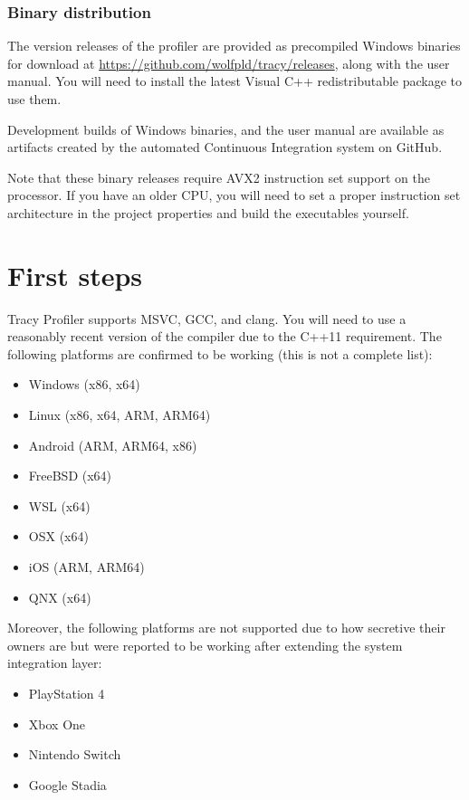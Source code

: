 \documentclass[hidelinks,titlepage,a4paper]{article}
\begin{document}
\subsubsection{Binary distribution}

The version releases of the profiler are provided as precompiled Windows binaries for download at \url{https://github.com/wolfpld/tracy/releases}, along with the user manual. You will need to install the latest Visual C++ redistributable package to use them.

Development builds of Windows binaries, and the user manual are available as artifacts created by the automated Continuous Integration system on GitHub.

Note that these binary releases require AVX2 instruction set support on the processor. If you have an older CPU, you will need to set a proper instruction set architecture in the project properties and build the executables yourself.

\section{First steps}
\label{firststeps}

Tracy Profiler supports  MSVC, GCC, and clang. You will need to use a reasonably recent version of the compiler due to the C++11 requirement. The following platforms are confirmed to be working (this is not a complete list):

\begin{itemize}
\item Windows (x86, x64)
\item Linux (x86, x64, ARM, ARM64)
\item Android (ARM, ARM64, x86)
\item FreeBSD (x64)
\item WSL (x64)
\item OSX (x64)
\item iOS (ARM, ARM64)
\item QNX (x64)
\end{itemize}

Moreover, the following platforms are not supported due to how secretive their owners are but were reported to be working after extending the system integration layer:

\begin{itemize}
\item PlayStation 4
\item Xbox One
\item Nintendo Switch
\item Google Stadia
\end{itemize}
\end{document}
